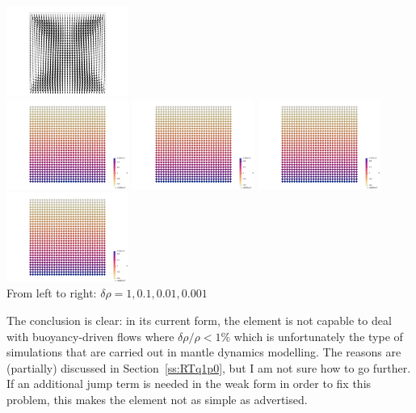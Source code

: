 \includegraphics[width=4cm]{python_codes/fieldstone_77/results/block/velDv}\\
\includegraphics[width=4cm]{python_codes/fieldstone_77/results/block/pA}
\includegraphics[width=4cm]{python_codes/fieldstone_77/results/block/pB}
\includegraphics[width=4cm]{python_codes/fieldstone_77/results/block/pC}
\includegraphics[width=4cm]{python_codes/fieldstone_77/results/block/pD}\\
{\captionfont From left to right: $\delta \rho=1,0.1,0.01,0.001$}

The conclusion is clear: in its current form, the element is not capable to 
deal with buoyancy-driven flows where $\delta \rho/\rho < 1\%$ which is 
unfortunately the type of simulations that are carried out in mantle dynamics modelling.
The reasons are (partially) discussed in Section~\ref{ss:RTq1p0}, but 
I am not sure how to go further. If an additional jump term is needed in the 
weak form in order to fix this problem, this makes the element not as simple as
advertised. 


